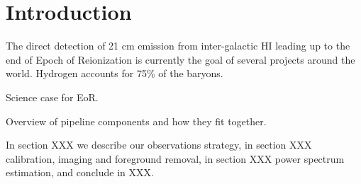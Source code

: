 \section{Introduction} 
The direct detection of 21 cm emission from inter-galactic HI leading up to the end of Epoch of Reionization is currently the goal of several projects around the world. Hydrogen accounts for 75\% of the baryons. 

Science case for EoR.

Overview of pipeline components and how they fit together.

In section XXX we describe our observations strategy, in section XXX calibration, imaging and foreground removal, in section XXX power spectrum estimation, and conclude in XXX.
